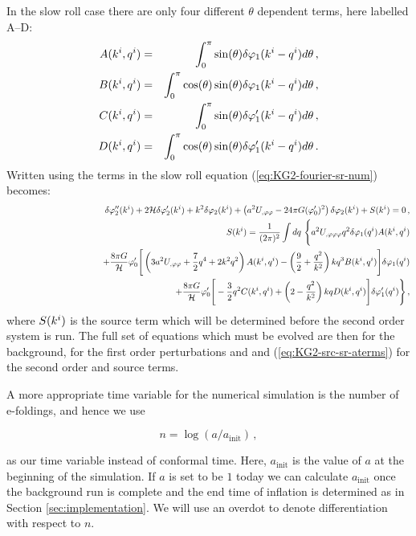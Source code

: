 In the slow roll case there are only four different $\theta$ dependent terms,
here labelled A--D:
%
\begin{eqnarray}
\label{eq:AtoD-num}
 A(k^i,q^i) &=& \int_0^\pi \sin(\theta) \delta\varphi_{1}(k^i-q^i) d\theta \,,
\nonumber\\
 B(k^i,q^i) &=& \int_0^\pi \cos(\theta)\sin(\theta) \delta\varphi_{1}(k^i-q^i)
d\theta \,,\nonumber\\
 C(k^i,q^i) &=& \int_0^\pi \sin(\theta) \delta\varphi_{1}'(k^i-q^i) d\theta \,,
\nonumber\\
 D(k^i,q^i) &=& \int_0^\pi \cos(\theta) \sin(\theta) \delta\varphi_{1}'(k^i-q^i)
d\theta \,.
\end{eqnarray}
%
Written using the terms in  the slow roll equation
(\ref{eq:KG2-fourier-sr-num}) becomes:
%
\begin{eqnarray}
\label{eq:KG2-fourier-sr-aterms}
&&\dvp2''(\kvi)+2\H\dvp2'(\kvi)+k^2\dvp2(\kvi)
+\left(a^2
\Upp-{24 \pi G}(\vp_{0}')^2\right)
\dvp2(\kvi)
+ S(\kvi) = 0 \,,\\
%
\label{eq:KG2-src-sr-aterms}
&&S(\kvi) = \frac{1}{(2\pi)^2}\int dq\ \Bigg\{
a^2\Uppp q^2 \dvp1(\qvi) A(\kvi,\qvi) \nonumber\\
&& \qquad\qquad\qquad\qquad\qquad + \frac{8\pi G}{\H}\vp_{0}' \Bigg[ 
\left( 3a^2\Upp + \frac{7}{2}q^4 + 2k^2q^2\right) A(\kvi,\qvi)
-\left(\frac{9}{2} + \frac{q^2}{k^2}\right)kq^3 B(\kvi,\qvi)
\Bigg]\dvp1(\qvi) \nonumber\\
%
&&\qquad\qquad\qquad\qquad \qquad+ \frac{8\pi G}{\H}\vp_{0}' \Bigg[
-\frac{3}{2}q^2 C(\kvi,\qvi) + \left(2-\frac{q^2}{k^2}\right)kq D(\kvi,\qvi) 
\Bigg]\dvp1'(\qvi) \Bigg\} \,,
%
\end{eqnarray}
%
where $S(k^i)$ is the source term which will be determined before the
second order system is run. The full set of equations which must be evolved are
then  for the background,  for the first
order perturbations and  and
(\ref{eq:KG2-src-sr-aterms}) for the second order and source terms.


A more appropriate time variable for the numerical simulation is the
number of e-foldings, and hence we use 
%

\begin{equation}
\label{eq:def-ntime}
n = \log ( a / a_{\mathrm{init}} )\,,
\end{equation}

%
as our time variable instead of conformal time. Here,
$a_{\mathrm{init}}$ is the value of $a$ at the beginning of the
simulation. If $a$ is set to be $1$ today we can calculate
$a_{\mathrm{init}}$ once the background run is complete and the end
time of inflation is determined as in Section
\ref{sec:implementation}. We will use an overdot to denote
differentiation with respect to $n$.



